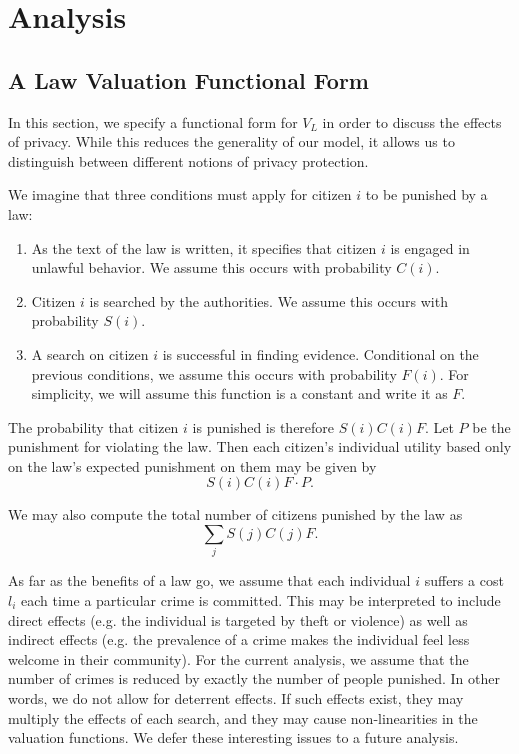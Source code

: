 
\section{Analysis}
\label{sec:analysis}



\subsection{A Law Valuation Functional Form}
In this section, we specify a functional form for $V_L$ in order to discuss the effects of privacy.  While this reduces the generality of our model, it allows us to distinguish between different notions of privacy protection.  

We imagine that three conditions must apply for citizen $i$ to be punished by a law:

\begin{enumerate}
\item As the text of the law is written, it specifies that citizen $i$ is engaged in unlawful behavior.  We assume this occurs with probability $C(i)$.
\item Citizen $i$ is searched by the authorities.  We assume this occurs with probability $S(i)$.
\item A search on citizen $i$ is successful in finding evidence.  Conditional on the previous conditions, we assume this occurs with probability $F(i)$.  For simplicity, we will assume this function is a constant and write it as $F$.
\end{enumerate}

The probability that citizen $i$ is punished is therefore $S(i)C(i)F$. 
Let $P$ be the punishment for violating the law. Then each citizen's individual utility based only on the law's expected punishment on them may be given by 
$$S(i)C(i)F\cdot P.$$

We may also compute the total number of citizens punished by the law as $$\sum_j S(j)C(j)F.$$  

As far as the benefits of a law go, we assume that each individual $i$ suffers a cost $l_i$ each time a particular crime is committed.  This may be interpreted to include direct effects (e.g. the individual is targeted by theft or violence) as well as indirect effects (e.g. the prevalence of a crime makes the individual feel less welcome in their community).  For the current analysis, we assume that the number of crimes is reduced by exactly the number of people punished.  In other words, we do not allow for deterrent effects.  If such effects exist, they may multiply the effects of each search, and they may cause non-linearities in the valuation functions.  We defer these interesting issues to a future analysis.

